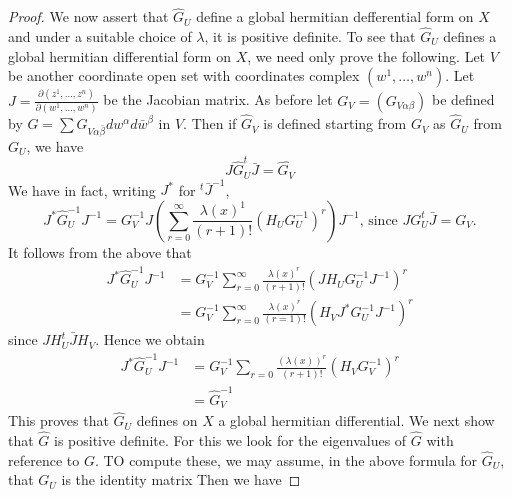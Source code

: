 \documentclass[lang=en,12pt]{beautybook}
\begin{document}
\begin{proof}
    We now assert that $\widehat{G}_U$ define a global hermitian defferential form on $X$ and under a suitable choice of $\lambda$, it is positive definite. To see that $\widehat{G}_U$ defines a global hermitian differential form on $X$, we need only prove the following. Let $V$ be another coordinate open set with coordinates complex $\left(w^1, \ldots, w^n\right)$. Let $J=\frac{\partial\left(z^1, \ldots, z^n\right)}{\partial\left(w^1, \ldots, w^n\right)}$ be the Jacobian matrix. As before let $G_V=\left(G_{V \alpha \beta}\right)$ be defined by $G=\sum G_{V \alpha \bar{\beta}} d w^\alpha d \bar{w}^\beta$ in $V$. Then if $\widehat{G}_V$ is defined starting from $G_V$ as $\widehat{G}_U$ from $G_U$, we have
    \begin{equation*}
    J \widehat{G}_U^t \bar{J}=\widehat{G_V}
    \end{equation*}
    We have in fact, writing $J^*$ for $^t \bar{J}^{-1}$,
    \begin{equation*}
    J^* \widehat{G}_U^{-1} J^{-1}=G_V^{-1} J\left(\sum_{r=0}^{\infty} \frac{\lambda(x)^1}{(r+1) !}\left(H_U G_U^{-1}\right)^r\right) J^{-1} \text {, since } J G_U^t \bar{J}=G_V .
    \end{equation*}
    It follows from the above that
    \begin{equation*}
    \begin{aligned}
    J^* \widehat{G}_U^{-1} J^{-1} & =G_V^{-1} \sum_{r=0}^{\infty} \frac{\lambda(x)^r}{(r+1) !}\left(J H_U G_U^{-1} J^{-1}\right)^r \\
    & =G_V^{-1} \sum_{r=0}^{\infty} \frac{\lambda(x)^r}{(r=1) !}\left(H_V J^* G_U^{-1} J^{-1}\right)^r
    \end{aligned}
    \end{equation*}
    since $J H_U^t \bar{J} H_V$. Hence we obtain
    \begin{equation*}
    \begin{aligned}
    J^* \widehat{G}_U^{-1} J^{-1} & =G_V^{-1} \sum_{r=0} \frac{(\lambda(x))^r}{(r+1) !}\left(H_V G_V^{-1}\right)^r \\
    & =\widehat{G}_V^{-1}
    \end{aligned}
    \end{equation*}
    This proves that $\widehat{G}_U$ defines on $X$ a global hermitian differential. We next show that $\widehat{G}$ is positive definite. For this we look for the eigenvalues of $\widehat{G}$ with reference to $G$. TO compute these, we may assume, in the above formula for $\widehat{G}_U$, that $G_U$ is the identity matrix
    Then we have

\end{proof}
\end{document}
